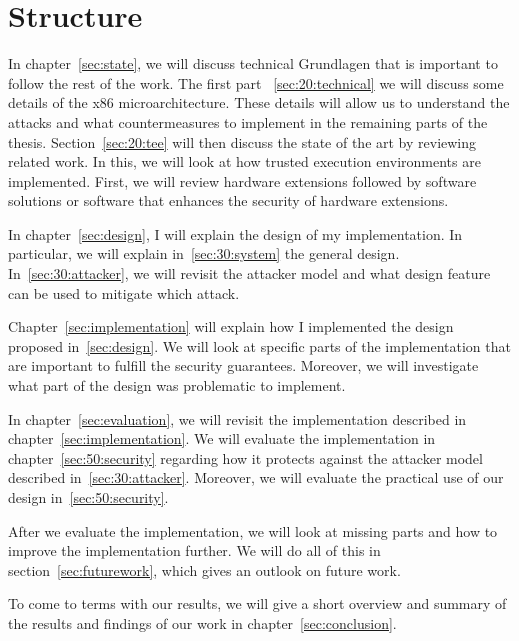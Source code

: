 \section{Structure}
\label{sec:10_structure}
In chapter~\ref{sec:state}, we will discuss technical Grundlagen that is important to follow the rest of the work. The first part
~\ref{sec:20:technical} we will discuss some details of the x86 microarchitecture. These details will allow us to understand the attacks
and what countermeasures to implement in the remaining parts of the thesis. Section~\ref{sec:20:tee} will then discuss the state of
the art by reviewing related work. In this, we will look at how trusted execution environments are implemented.
First, we will review hardware extensions followed by software solutions or software that enhances the security of
hardware extensions.

In chapter~\ref{sec:design}, I will explain the design of my implementation. In particular, we will explain in~\ref{sec:30:system} the general
design. In~\ref{sec:30:attacker}, we will revisit the attacker model and what design feature can be used to mitigate which attack.

Chapter~\ref{sec:implementation} will explain how I implemented the design proposed in~\ref{sec:design}. We will look at specific parts of
the implementation that are important to fulfill the security guarantees. Moreover, we will investigate what part
of the design was problematic to implement.

In chapter~\ref{sec:evaluation}, we will revisit the implementation described in chapter~\ref{sec:implementation}. We will evaluate the implementation in
chapter~\ref{sec:50:security} regarding how it protects against the attacker model described in~\ref{sec:30:attacker}. Moreover, we will evaluate
the practical use of our design in~\ref{sec:50:security}.

After we evaluate the implementation, we will look at missing parts and how to improve the implementation further. We
will do all of this in section~\ref{sec:futurework}, which gives an outlook on future work.

To come to terms with our results, we will give a short overview and summary of the results and findings of our work in
chapter~\ref{sec:conclusion}.
